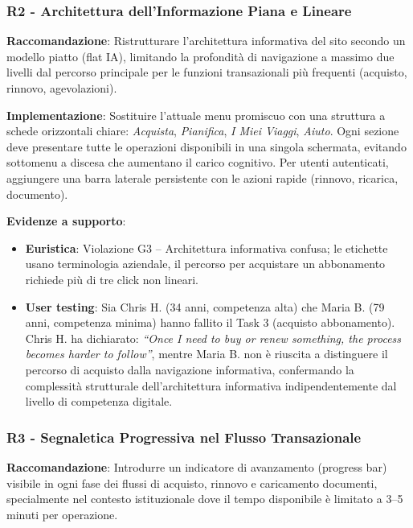 \documentclass[11pt,a4paper]{article}
\begin{document}
\subsubsection{R2 - Architettura dell'Informazione Piana e Lineare}
\label{rec:R2}

\textbf{Raccomandazione}: Ristrutturare l’architettura informativa del sito
secondo un modello piatto (flat IA), limitando la profondit\`a di navigazione
a massimo due livelli dal percorso principale per le funzioni transazionali
pi\`u frequenti (acquisto, rinnovo, agevolazioni).

\textbf{Implementazione}: Sostituire l’attuale menu promiscuo con una
struttura a schede orizzontali chiare: \textit{Acquista}, \textit{Pianifica},
\textit{I Miei Viaggi}, \textit{Aiuto}. Ogni sezione deve presentare tutte le
operazioni disponibili in una singola schermata, evitando sottomenu a discesa
che aumentano il carico cognitivo. Per utenti autenticati, aggiungere una
barra laterale persistente con le azioni rapide (rinnovo, ricarica, documento).

\textbf{Evidenze a supporto}:
\begin{itemize}
    \item \textbf{Euristica}: Violazione G3 -- Architettura informativa
    confusa; le etichette usano terminologia aziendale, il percorso per
    acquistare un abbonamento richiede pi\`u di tre click non lineari.
    \item \textbf{User testing}: Sia Chris H. (34 anni, competenza alta) che
    Maria B. (79 anni, competenza minima) hanno fallito il Task 3 (acquisto
    abbonamento). Chris H. ha dichiarato: \textit{“Once I need to buy or renew
    something, the process becomes harder to follow”}, mentre Maria B. non \`e
    riuscita a distinguere il percorso di acquisto dalla navigazione
    informativa, confermando la complessit\`a strutturale dell'architettura
    informativa indipendentemente dal livello di competenza digitale.
\end{itemize}

\subsubsection{R3 - Segnaletica Progressiva nel Flusso Transazionale}
\label{rec:R3}

\textbf{Raccomandazione}: Introdurre un indicatore di avanzamento
(progress bar) visibile in ogni fase dei flussi di acquisto, rinnovo e
caricamento documenti, specialmente nel contesto istituzionale dove il tempo
disponibile \`e limitato a 3--5 minuti per operazione.
\end{document}
